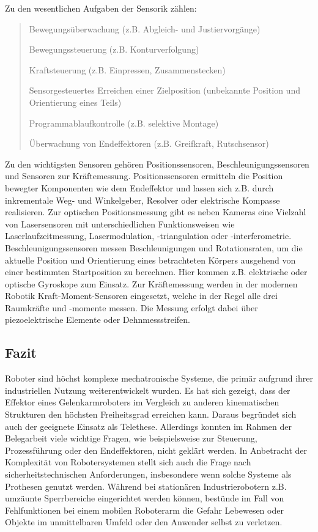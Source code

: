 \documentclass[11pt,ngerman,parskip=half]{scrartcl}
\begin{document}
Zu den wesentlichen Aufgaben der Sensorik zählen:
\blockquote[{\cite[][97]{hesse_taschenbuch_2016}}]{
  \begin{compactitem}
    \item Bewegungsüberwachung (z.B. Abgleich- und Justiervorgänge)
    \item Bewegungssteuerung (z.B. Konturverfolgung)
    \item Kraftsteuerung (z.B. Einpressen, Zusammenstecken)
    \item Sensorgesteuertes Erreichen einer Zielposition (unbekannte Position
          und Orientierung eines Teils)
    \item Programmablaufkontrolle (z.B. selektive Montage)
    \item Überwachung von Endeffektoren (z.B. Greifkraft, Rutschsensor)
  \end{compactitem}
}

Zu den wichtigsten Sensoren gehören Positionssensoren,
Beschleunigungssensoren und Sensoren zur Kräftemessung. Positionssensoren
ermitteln die Position bewegter Komponenten wie dem Endeffektor und lassen sich
z.B. durch inkrementale Weg- und Winkelgeber, Resolver oder elektrische Kompasse
realisieren. Zur optischen Positionsmessung gibt es neben Kameras eine Vielzahl 
von Lasersensoren mit unterschiedlichen Funktionsweisen wie
Laserlaufzeitmessung, Lasermodulation, -triangulation oder -interferometrie.
Beschleunigungssensoren messen Beschleunigungen und Rotationsraten, um die
aktuelle Position und Orientierung eines betrachteten Körpers ausgehend von
einer bestimmten Startposition zu berechnen. Hier kommen z.B. elektrische
oder optische Gyroskope zum Einsatz. Zur Kräftemessung werden in der modernen
Robotik Kraft-Moment-Sensoren eingesetzt, welche in der Regel alle drei
Raumkräfte und -momente messen. Die Messung erfolgt dabei über
piezoelektrische Elemente oder Dehnmessstreifen.
\parencite[vgl.][98--117]{hesse_taschenbuch_2016}

\subsection{Fazit}
\label{subsec:john_fazit}
Roboter sind höchst komplexe mechatronische Systeme, die primär aufgrund
ihrer industriellen Nutzung weiterentwickelt wurden. Es hat sich gezeigt,
dass der Effektor eines Gelenkarmroboters im Vergleich zu anderen
kinematischen Strukturen den höchsten Freiheitsgrad erreichen kann. Daraus
begründet sich auch der geeignete Einsatz als Telethese. Allerdings konnten
im Rahmen der Belegarbeit viele wichtige Fragen, wie beispielsweise zur
Steuerung, Prozessführung oder den Endeffektoren, nicht geklärt werden. In
Anbetracht der Komplexität von Robotersystemen stellt sich auch die Frage
nach sicherheitstechnischen Anforderungen, insbesondere wenn solche Systeme
als Prothesen genutzt werden. Während bei stationären Industrierobotern z.B.
umzäunte Sperrbereiche eingerichtet werden können, bestünde im Fall von
Fehlfunktionen bei einem mobilen Roboterarm die Gefahr Lebewesen oder Objekte
im unmittelbaren Umfeld oder den Anwender selbst zu verletzen.
\end{document}
